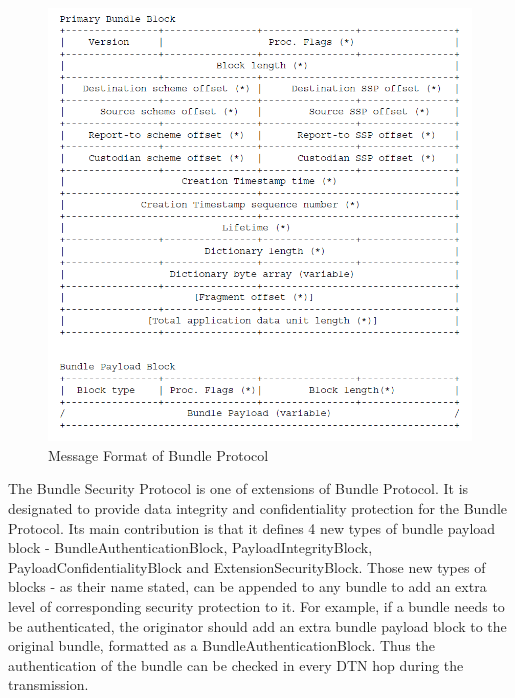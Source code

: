 \begin{figure}[h!]
\centering
\includegraphics[width=\textwidth,natwidth=829,natheight=847]{figures/bundleblockformat.png}
\caption{Message Format of Bundle Protocol \cite{RFC5050}}
\label{fig:bundleblockformat}
\end{figure}

The Bundle Security Protocol is one of extensions of Bundle Protocol. It is designated to provide data integrity and confidentiality protection for the Bundle Protocol. Its main contribution is that it defines 4 new types of bundle payload block - BundleAuthenticationBlock, PayloadIntegrityBlock, PayloadConfidentialityBlock and ExtensionSecurityBlock. Those new types of blocks - as their name stated, can be appended to any bundle to add an extra level of corresponding security protection to it. For example, if a bundle needs to be authenticated, the originator should add an extra bundle payload block to the original bundle, formatted as a BundleAuthenticationBlock. Thus the authentication of the bundle can be checked in every DTN hop during the transmission.


